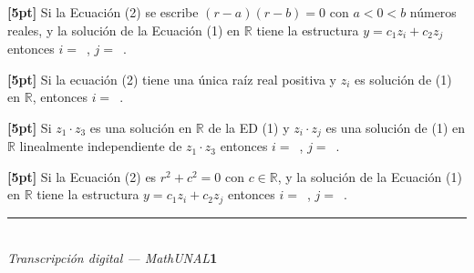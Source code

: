 \documentclass[11pt]{article}
\begin{document}
\begin{opciones}
\item[(a)] \textbf{[5pt]} Si la Ecuación (2) se escribe $(r-a)(r-b)=0$ con $a<0<b$ números reales, y la solución de la Ecuación (1) en $\mathbb{R}$ tiene la estructura $y=c_1z_i+c_2z_j$ entonces $i=$~\underline{\hspace{1.2cm}}, $j=$~\underline{\hspace{1.2cm}}.
\item[(b)] \textbf{[5pt]} Si la ecuación (2) tiene una única raíz real positiva y $z_i$ es solución de (1) en $\mathbb{R}$, entonces $i=$~\underline{\hspace{1.2cm}}.
\item[(c)] \textbf{[5pt]} Si $z_1\cdot z_3$ es una solución en $\mathbb{R}$ de la ED (1) y $z_i\cdot z_j$ es una solución de (1) en $\mathbb{R}$ linealmente independiente de $z_1\cdot z_3$ entonces $i=$~\underline{\hspace{1.2cm}}, $j=$~\underline{\hspace{1.2cm}}.
\item[(d)] \textbf{[5pt]} Si la Ecuación (2) es $r^2+c^2=0$ con $c\in\mathbb{R}$, y la solución de la Ecuación (1) en $\mathbb{R}$ tiene la estructura $y=c_1z_i+c_2z_j$ entonces $i=$~\underline{\hspace{1.2cm}}, $j=$~\underline{\hspace{1.2cm}}.
\end{opciones}

\vfill
\rule{\linewidth}{0.4pt}\\[1pt]
{\scriptsize\textit{Transcripción digital --- MathUNAL}\hfill\textcolor{unalblue}{\textbf{1}}}
\end{document}
